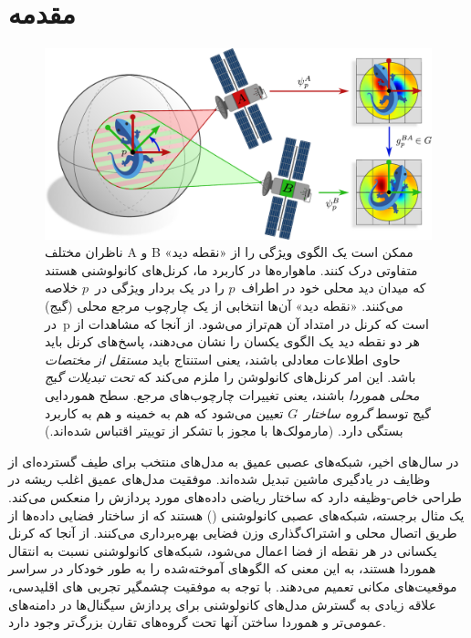 

\section{مقدمه}


\begin{figure}
	\centering
	\vspace*{-2ex}
	\includegraphics[width=.94\textwidth]{figures/satellite_kernels.pdf}
	\caption{\small
		ناظران مختلف A و B ممکن است یک الگوی ویژگی را از «نقطه دید» متفاوتی درک کنند.
		ماهواره‌ها در کاربرد ما، کرنل‌های کانولوشنی هستند که میدان دید محلی خود در اطراف~$p$ را در یک بردار ویژگی در~$p$ خلاصه می‌کنند.
		«نقطه دید» آن‌ها انتخابی از یک چارچوب مرجع محلی (گیج) در~p است که کرنل در امتداد آن هم‌تراز می‌شود.
		از آنجا که مشاهدات از هر دو نقطه دید یک الگوی یکسان را نشان می‌دهند، پاسخ‌های کرنل باید حاوی اطلاعات معادلی باشند، یعنی استنتاج باید \emph{مستقل از مختصات} باشد.
		این امر کرنل‌های کانولوشن را ملزم می‌کند که \emph{تحت تبدیلات گیج محلی هموردا} باشند، یعنی تغییرات چارچوب‌های مرجع.
		سطح هموردایی گیج توسط \emph{گروه ساختار}~$G$ تعیین می‌شود که هم به خمینه و هم به کاربرد بستگی دارد.
		{
			\color{gray}
			\scriptsize
			(مارمولک‌ها با مجوز \href{https://github.com/twitter/twemoji/blob/gh-pages/LICENSE-GRAPHICS}{\underline{}} با تشکر از توییتر اقتباس شده‌اند.)
		}
	}
	\label{fig:satellite}
\end{figure}


در سال‌های اخیر، شبکه‌های عصبی عمیق به مدل‌های منتخب برای طیف گسترده‌ای از وظایف در یادگیری ماشین تبدیل شده‌اند.
موفقیت مدل‌های عمیق اغلب ریشه در طراحی خاص-وظیفه دارد که ساختار ریاضی داده‌های مورد پردازش را منعکس می‌کند.
یک مثال برجسته، شبکه‌های عصبی کانولوشنی (\CNN) هستند که از ساختار فضایی داده‌ها از طریق اتصال محلی و اشتراک‌گذاری وزن فضایی بهره‌برداری می‌کنند.
از آنجا که کرنل یکسانی در هر نقطه از فضا اعمال می‌شود، شبکه‌های کانولوشنی نسبت به انتقال هموردا هستند، به این معنی که الگوهای آموخته‌شده را به طور خودکار در سراسر موقعیت‌های مکانی تعمیم می‌دهند.
با توجه به موفقیت چشمگیر تجربی \CNN{}های اقلیدسی، علاقه زیادی به گسترش مدل‌های کانولوشنی برای پردازش سیگنال‌ها در دامنه‌های عمومی‌تر و هموردا ساختن آنها تحت گروه‌های تقارن بزرگ‌تر وجود دارد.


